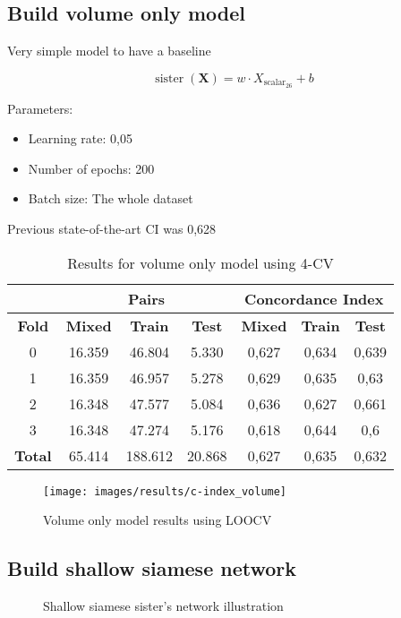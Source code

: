 \subsection{Build volume only model}
\begin{frame}{\insertsubsec}
  Very simple model to have a baseline

  \[
    \operatorname{sister}(\bm{X}) = w\cdot X_{\text{scalar}_{26}} + b
  \]
\end{frame}
\begin{frame}
  Parameters:
  \begin{itemize}
    \item Learning rate: 0,05
    \item Number of epochs: 200
    \item Batch size: The whole dataset
  \end{itemize}

  Previous state-of-the-art CI was 0,628

  \begin{table}
    \centering
    \begin{tabular}{|c||c|c|c||c|c|c|}
      \cline{2-7}
      \multicolumn{1}{c|}{} & \multicolumn{3}{|c||}{\textbf{Pairs}} & 
      \multicolumn{3}{c|}{\textbf{Concordance Index}} \\
      \hline
      \textbf{Fold} & \textbf{Mixed} & \textbf{Train} & \textbf{Test} 
      & \textbf{Mixed} & \textbf{Train} & \textbf{Test} \\
      \hhline{=======}
      0 & 16.359 & 46.804 & 5.330 & 0,627 & 0,634 & 0,639 \\
      1 & 16.359 & 46.957 & 5.278 & 0,629 & 0,635 & 0,63 \\
      2 & 16.348 & 47.577 & 5.084 & 0,636 & 0,627 & 0,661 \\
      3 & 16.348 & 47.274 & 5.176 & 0,618 & 0,644 & 0,6 \\
      \hhline{=======}
      \textbf{Total} & 65.414 & 188.612 & 20.868 & 0,627 & 0,635 & 0,632 \\
      \hline
    \end{tabular}
  
    \caption[Volume Only 4-CV results]{
      Results for volume only model using 4-CV \label{tab:results-volume-4CV}
    }
  \end{table}
\end{frame}

\begin{frame}
  \begin{figure}
    \centering
    \texttt{[image: images/results/c-index\_volume]}
    \caption[LOOCV volume only model results]{
      Volume only model results using LOOCV \label{fig:results-volume-LOOCV}
    }
  \end{figure}
\end{frame}

\subsection{Build shallow siamese network}
\begin{frame}{\insertsubsec}
  \begin{figure}
    \centering
    \scalebox{.7}{}
    \caption{Shallow siamese sister's network illustration \label{fig:shallow-implement}}
  \end{figure}
\end{frame}
